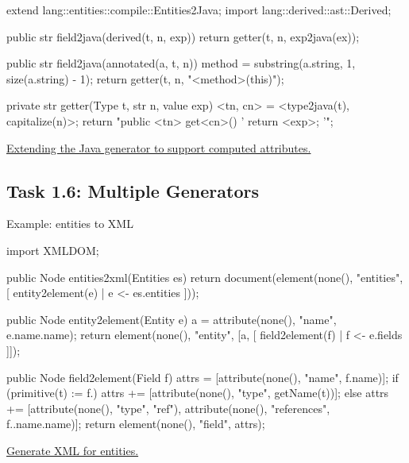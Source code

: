 \documentclass[a4paper]{article}
\def\source#1#2{\href{http://svn.rascal-mpl.org/lwc/trunk/lwc11/src/#1}{#2}}
\begin{document}
\begin{listing}
\begin{rascal}
extend lang::entities::compile::Entities2Java;
import lang::derived::ast::Derived;

public str field2java(derived(t, n, exp)) {
    return getter(t, n, exp2java(ex));
}

public str field2java(annotated(a, t, n)) {
    method = substring(a.string, 1, size(a.string) - 1);
    return getter(t, n, "<method>(this)");
}

private str getter(Type t, str n, value exp) {
    <tn, cn> = <type2java(t), capitalize(n)>;
    return "public <tn> get<cn>() {
           '    return <exp>;
           '}";
}
\end{rascal}
\caption{\source{lang/derived/compile/Derived2Java.rsc}{Extending the
    Java generator to support computed
    attributes.}\label{LST:derived2java}}
\end{listing}



\subsection*{Task 1.6: Multiple Generators}

Example: entities to XML

\begin{listing}
\begin{rascal}
import XMLDOM;

public Node entities2xml(Entities es) {
    return document(element(none(), "entities", 
       [ entity2element(e) | e <- es.entities ]));
}

public Node entity2element(Entity e) {
    a = attribute(none(), "name", e.name.name);
    return element(none(), "entity", 
       [a, [ field2element(f) | f <- e.fields ]]); 
}

public Node field2element(Field f) {
    attrs = [attribute(none(), "name", f.name)];
    if (primitive(t) := f.\type) {
        attrs += [attribute(none(), "type", getName(t))];
    }
    else {
        attrs += [attribute(none(), "type", "ref"),
                    attribute(none(), "references", f.\type.name.name)];
    }
    return element(none(), "field", attrs); 
}
\end{rascal}
\caption{\source{lang/entities/compile/Derived2XML.rsc}{Generate XML
    for entities.}\label{LST:entities2xml}}
\end{listing}
\end{document}

